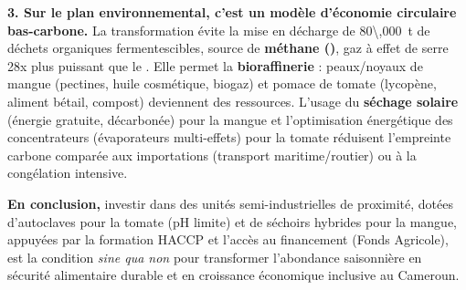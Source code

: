 \documentclass[11pt]{article}
\begin{document}
\begin{exoresolu}
    \textbf{3. Sur le plan environnemental, c'est un modèle d'économie circulaire bas-carbone.}
    La transformation évite la mise en décharge de \SI{80\,000}{t} de déchets organiques fermentescibles, source de \textbf{méthane ()}, gaz à effet de serre 28x plus puissant que le . Elle permet la \textbf{bioraffinerie} : peaux/noyaux de mangue (pectines, huile cosmétique, biogaz) et pomace de tomate (lycopène, aliment bétail, compost) deviennent des ressources. L'usage du \textbf{séchage solaire} (énergie gratuite, décarbonée) pour la mangue et l'optimisation énergétique des concentrateurs (évaporateurs multi-effets) pour la tomate réduisent l'empreinte carbone comparée aux importations (transport maritime/routier) ou à la congélation intensive.
    
    \textbf{En conclusion,} investir dans des unités semi-industrielles de proximité, dotées d'autoclaves pour la tomate (pH limite) et de séchoirs hybrides pour la mangue, appuyées par la formation HACCP et l'accès au financement (Fonds Agricole), est la condition \emph{sine qua non} pour transformer l'abondance saisonnière en sécurité alimentaire durable et en croissance économique inclusive au Cameroun.
\end{exoresolu}
\end{document}
